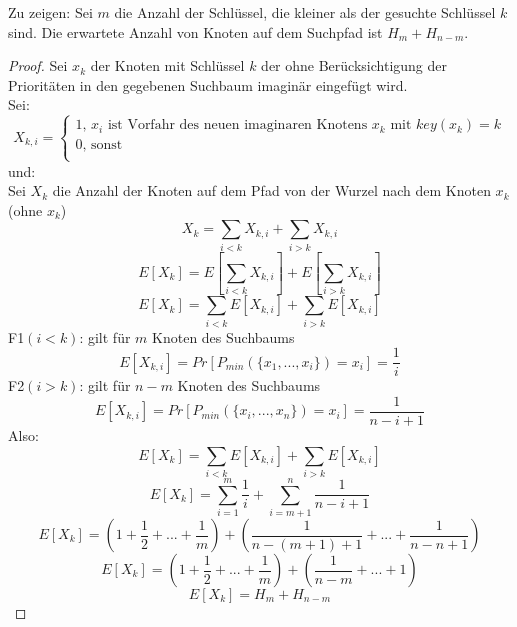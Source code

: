 \documentclass{article}
\begin{document}
 Zu zeigen: Sei $m$ die Anzahl der Schlüssel, die kleiner als der gesuchte Schlüssel $k$ sind. Die erwartete Anzahl von Knoten auf dem Suchpfad ist $H_{m}+H_{n-m}$. 
\begin{proof}
\noindent

Sei $x_{k}$ der Knoten mit Schlüssel $k$ der ohne Berücksichtigung der Prioritäten in den gegebenen Suchbaum imaginär eingefügt wird.\\

Sei:\\
  \[
    X_{k,i}=\left\{
                \begin{array}{ll}
                  1\text{, } x_{i} \text{ ist Vorfahr des neuen imaginaren Knotens } x_{k} \text{ mit } key(x_{k})=k\\
                  0 \text{, sonst}\\
                
                \end{array}
              \right.
  \]
und:\\
Sei $X_{k}$ die Anzahl der Knoten auf dem Pfad von der Wurzel nach dem Knoten $x_{k}$ (ohne $x_{k}$)
\begin{equation}
X_{k}=\sum_{i<k} X_{k,i} +\sum_{i>k} X_{k,i}
\end{equation}
\begin{equation}
E[X_{k}]=E[\sum_{i<k} X_{k,i}] +E[\sum_{i>k} X_{k,i}]
\end{equation}
\begin{equation}
E[X_{k}]=\sum_{i<k} E[X_{k,i}] +\sum_{i>k} E[X_{k,i}]
\end{equation}
F1$(i<k)$: gilt für $m$ Knoten des Suchbaums\\
\begin{equation}
E[X_{k,i}]=Pr[P_{min}(\lbrace x_{1},...,x_{i}\rbrace)=x_{i}]=\frac{1}{i}
\end{equation}
F2$(i>k)$: gilt für $n-m$ Knoten des Suchbaums\\
\begin{equation}
E[X_{k,i}]=Pr[P_{min}(\lbrace x_{i},...,x_{n}\rbrace)=x_{i}]=\frac{1}{n-i+1}
\end{equation}
Also:\\
\begin{equation}
E[X_{k}]=\sum_{i<k} E[X_{k,i}] +\sum_{i>k} E[X_{k,i}]
\end{equation}
\begin{equation}
E[X_{k}]=\sum_{i=1}^{m} \frac{1}{i} +\sum_{i=m+1}^{n} \frac{1}{n-i+1}
\end{equation}
\begin{equation}
E[X_{k}]=(1+\frac{1}{2}+...+\frac{1}{m})+(\frac{1}{n-(m+1)+1}+...+\frac{1}{n-n+1})
\end{equation}
\begin{equation}
E[X_{k}]=(1+\frac{1}{2}+...+\frac{1}{m})+(\frac{1}{n-m}+...+1)
\end{equation}
\begin{equation}
E[X_{k}]=H_{m}+H_{n-m}
\end{equation}
\end{proof}
\end{document}

